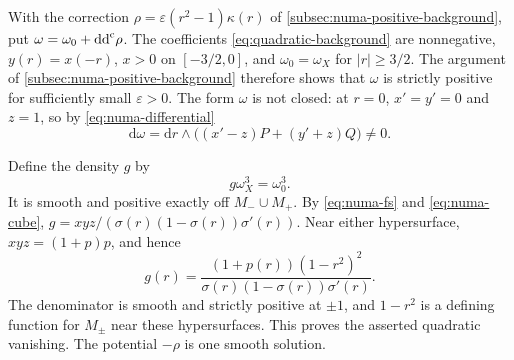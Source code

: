 With the correction $\rho=\varepsilon(r^2-1)\kappa(r)$ of \cref{subsec:numa-positive-background}, put $\omega=\omega_0+\mathrm{dd}^{\mathrm{c}}\rho$. The coefficients \eqref{eq:quadratic-background} are nonnegative, $y(r)=x(-r)$, $x>0$ on $[-3/2,0]$, and $\omega_0=\omega_X$ for $|r|\geq3/2$. The argument of \cref{subsec:numa-positive-background} therefore shows that $\omega$ is strictly positive for sufficiently small $\varepsilon>0$. The form $\omega$ is not closed: at $r=0$, $x'=y'=0$ and $z=1$, so by \eqref{eq:numa-differential}
\[
 \mathrm{d}\omega=\mathrm{d}r\wedge\bigl((x'-z)P+(y'+z)Q\bigr)\ne0.
\]

Define the density $g$ by
\[
 g\omega_X^3=\omega_0^3.
\]
It is smooth and positive exactly off $M_-\cup M_+$. By \eqref{eq:numa-fs} and \eqref{eq:numa-cube}, $g=xyz/(\sigma(r)(1-\sigma(r))\sigma'(r))$. Near either hypersurface, $xyz=(1+p)p$, and hence
\[
 g(r)=\frac{(1+p(r))(1-r^2)^2}{\sigma(r)(1-\sigma(r))\sigma'(r)}.
\]
The denominator is smooth and strictly positive at $\pm1$, and $1-r^2$ is a defining function for $M_\pm$ near these hypersurfaces. This proves the asserted quadratic vanishing. The potential $-\rho$ is one smooth solution.

